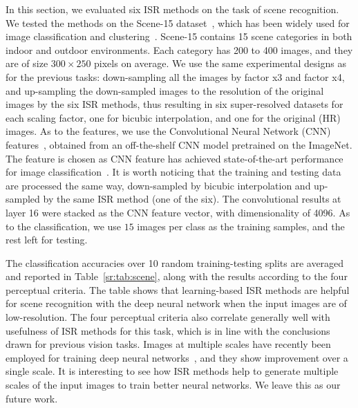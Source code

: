 In this section, we evaluated six ISR methods on the task of scene recognition. 
We tested the methods on the Scene-15 dataset~\citep{lazebnik:cvpr06}, which has been widely 
used for image classification and clustering~\citep{lazebnik:cvpr06, dai:ensemble:eccv12, dai:EnPro:iccv13}. 
Scene-15 contains 15
scene categories in both indoor and outdoor environments. Each category has 200
to 400 images, and they are of size $300 \times 250$ pixels on average.
We use the same experimental designs as for the previous tasks:  down-sampling all the images by 
factor x3 and factor x4, and up-sampling the down-sampled images to the
resolution of the original images by the six ISR methods, thus resulting in six super-resolved datasets 
for each scaling factor, one for bicubic interpolation, and one for the original (HR) images.  
As to the features, we use the  Convolutional Neural Network (CNN) features~\citep{deep:bmvc14}, 
obtained from an off-the-shelf CNN model pretrained on the ImageNet. The feature is  chosen as CNN 
feature has achieved state-of-the-art performance for image
classification~\citep{deep:bmvc14}. It is worth noticing that the training and testing data are processed 
the same way, \ie down-sampled by bicubic interpolation and up-sampled by the same ISR method (one of the six).  
The convolutional results at layer 16 were
stacked as the CNN feature vector, with dimensionality of
4096.  As to the classification, we use $15$ images per class as the training samples, and the rest left for testing. 

The classification accuracies over 10 random training-testing splits are averaged and reported in Table~\ref{sr:tab:scene}, along with the results according to the four perceptual criteria.  
The table shows that learning-based ISR methods are helpful for scene 
recognition with the deep neural network when the input images are of low-resolution. 
The four perceptual criteria also correlate 
generally well with usefulness of ISR methods for this task, 
which is in line with the conclusions drawn for previous vision tasks.   
Images at multiple scales have recently been employed for training deep 
neural networks~\citep{cnn:multi-scale, fully_cnn},  and 
they show improvement over a single scale.  It is interesting to 
see how ISR methods help to generate multiple scales of the input images to train 
better neural networks. We leave this as our future work. 




